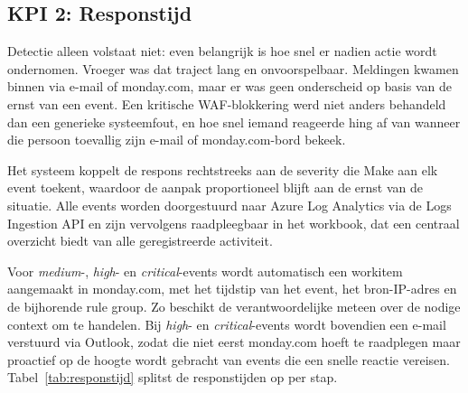 
\subsection{KPI 2: Responstijd}
Detectie alleen volstaat niet: even belangrijk is hoe snel er nadien actie wordt ondernomen. Vroeger was dat traject lang en onvoorspelbaar. Meldingen kwamen binnen via e-mail of monday.com, maar er was geen onderscheid op basis van de ernst van een event. Een kritische WAF-blokkering werd niet anders behandeld dan een generieke systeemfout, en hoe snel iemand reageerde hing af van wanneer die persoon toevallig zijn e-mail of monday.com-bord bekeek.

Het systeem koppelt de respons rechtstreeks aan de severity die Make aan elk event toekent, waardoor de aanpak proportioneel blijft aan de ernst van de situatie. Alle events worden doorgestuurd naar Azure Log Analytics via de Logs Ingestion API en zijn vervolgens raadpleegbaar in het workbook, dat een centraal overzicht biedt van alle geregistreerde activiteit.

Voor \textit{medium}-, \textit{high}- en \textit{critical}-events wordt automatisch een workitem aangemaakt in monday.com, met het tijdstip van het event, het bron-IP-adres en de bijhorende rule group. Zo beschikt de verantwoordelijke meteen over de nodige context om te handelen. Bij \textit{high}- en \textit{critical}-events wordt bovendien een e-mail verstuurd via Outlook, zodat die niet eerst monday.com hoeft te raadplegen maar proactief op de hoogte wordt gebracht van events die een snelle reactie vereisen. Tabel~\ref{tab:responstijd} splitst de responstijden op per stap.


